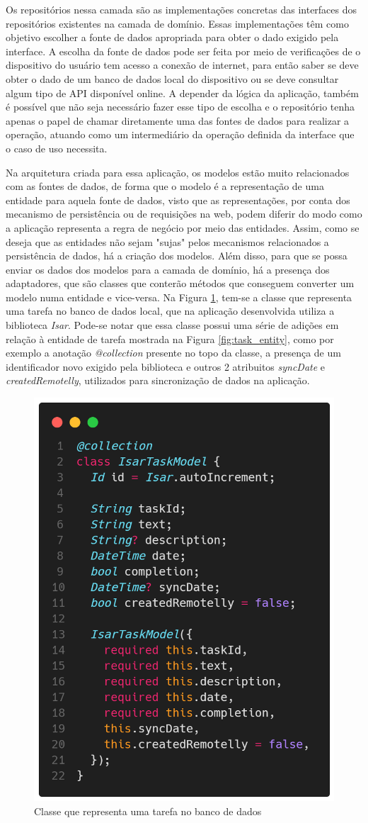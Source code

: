 \documentclass[12pt, %
openright, 
oneside, %
a4paper,    %
brazil]{facom-ufu-abntex2}
\begin{document}
Os repositórios nessa camada são as implementações concretas das interfaces dos repositórios existentes na camada de domínio. Essas implementações têm como objetivo escolher a fonte de dados apropriada para obter o dado exigido pela interface. A escolha da fonte de dados pode ser feita por meio de verificações de o dispositivo do usuário tem acesso a conexão de internet, para então saber se deve obter o dado de um banco de dados local do dispositivo ou se deve consultar algum tipo de API disponível online. A depender da lógica da aplicação, também é possível que não seja necessário fazer esse tipo de escolha e o repositório tenha apenas o papel de chamar diretamente uma das fontes de dados para realizar a operação, atuando como um intermediário da operação definida da interface que o caso de uso necessita.

Na arquitetura criada para essa aplicação, os modelos estão muito relacionados com as fontes de dados, de forma que o modelo é a representação de uma entidade para aquela fonte de dados, visto que as representações, por conta dos mecanismo de persistência ou de requisições na web, podem diferir do modo como a aplicação representa a regra de negócio por meio das entidades. Assim, como se deseja que as entidades não sejam "sujas" pelos mecanismos relacionados a persistência de dados, há a criação dos modelos. Além disso, para que se possa enviar os dados dos modelos para a camada de domínio, há a presença dos adaptadores, que são classes que conterão métodos que conseguem converter um modelo numa entidade e vice-versa. Na Figura \ref{fig:isar_task_model}, tem-se a classe que representa uma tarefa no banco de dados local, que na aplicação desenvolvida utiliza a biblioteca \textit{Isar}. Pode-se notar que essa classe possui uma série de adições em relação à entidade de tarefa mostrada na Figura \ref{fig:task_entity}, como por exemplo a anotação \textit{@collection} presente no topo da classe, a presença de um identificador novo exigido pela biblioteca e outros 2 atribuitos \textit{syncDate} e \textit{createdRemotelly}, utilizados para sincronização de dados na aplicação.

\begin{figure}[ht]
    \centering
    \includegraphics[width=.5\textwidth, trim={0 30 0 100}, clip]{figures/arch/isar_task_model.png}
    \caption{Classe que representa uma tarefa no banco de dados}
    \label{fig:isar_task_model}
\end{figure}
\end{document}
